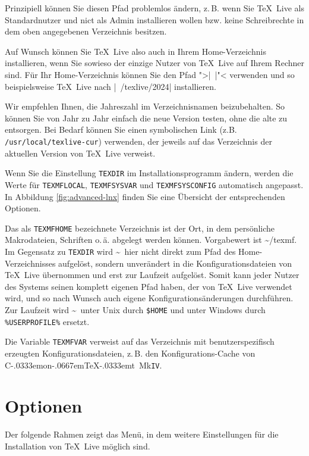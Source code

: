 \documentclass[12pt,ngerman,a4paper,fullparskip]{report}
\newcommand{\TL}{\TeX\ Live\xspace}
\newcommand{\acro}[1]{\texttt{#1}}
\newcommand{\dirname}[1]{\texttt{#1}}
\newcommand\ConTeXt{C\kern-.0333emon\-\kern-.0667em\TeX\kern-.0333emt}
\begin{document}
Prinzipiell können Sie diesen Pfad problemlos ändern, z.\,B. wenn Sie \TL als Standardnutzer und nict als Admin installieren wollen bzw. keine Schreibrechte in dem oben angegebenen Verzeichnis besitzen.

Auf Wunsch können Sie \TL also auch in Ihrem Home-Verzeichnis installieren, wenn Sie sowieso der einzige Nutzer von \TL auf Ihrem Rechner sind. Für Ihr Home-Verzeichnis können Sie den Pfad ">|~|"< verwenden und so beispielsweise \TL nach  |~/texlive/2024| installieren.

Wir empfehlen Ihnen, die Jahreszahl im Verzeichnisnamen beizubehalten. So können Sie von Jahr zu Jahr einfach die neue Version testen, ohne die alte zu entsorgen. Bei Bedarf können Sie einen symbolischen
Link (z.B. \dirname{/usr/local/texlive-cur}) verwenden, der jeweils auf das Verzeichnis der aktuellen Version von \TL verweist.

Wenn Sie die Einstellung \dirname{TEXDIR} im Installationsprogramm ändern, werden die Werte für
\dirname{TEXMFLOCAL}, \dirname{TEXMFSYSVAR} und \dirname{TEXMFSYSCONFIG} automatisch angepasst. In Abbildung \ref{fig:advanced-lnx} finden Sie eine Übersicht der entsprechenden Optionen.

Das als \dirname{TEXMFHOME} bezeichnete Verzeichnis ist der Ort, in dem persönliche Makrodateien,
Schriften o.\,ä. abgelegt werden können. Vorgabewert ist \textasciitilde/texmf. Im Gegensatz zu \dirname{TEXDIR} wird \textasciitilde\ hier nicht direkt zum Pfad des Home-Verzeichnisses aufgelöst, sondern unverändert in die Konfigurationsdateien von \TL übernommen und erst zur Laufzeit aufgelöst. Somit kann jeder Nutzer des Systems seinen komplett eigenen Pfad haben, der von \TL verwendet wird, und so nach Wunsch auch eigene Konfigurationsänderungen durchführen. Zur Laufzeit wird \textasciitilde\ unter Unix durch \dirname{\$HOME} und unter Windows durch \verb|%USERPROFILE%| ersetzt.

Die Variable \dirname{TEXMFVAR} verweist auf das Verzeichnis mit benutzerspezifisch
erzeugten Konfigurationsdateien, z.\,B. den Konfigurations-Cache von \ConTeXt\ Mk\acro{IV}.

\clearpage

\section{Optionen}\label{sec:options}

Der folgende Rahmen zeigt das Menü, in dem weitere Einstellungen für die Installation von \TL möglich sind.
\end{document}
